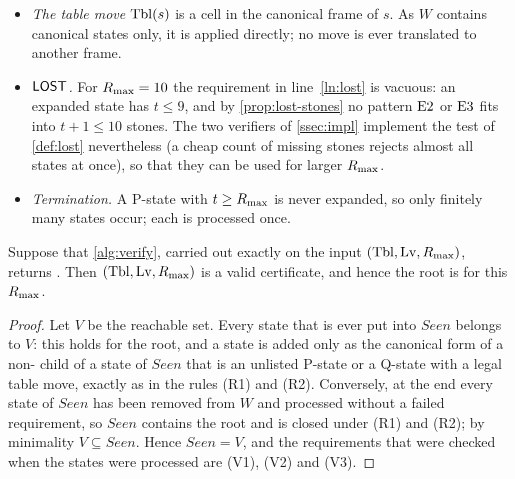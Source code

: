 \begin{itemize}[leftmargin=1.6em]
  the same parent, while children of different states with the same canonical form are counted
  separately. A \VOID{} child of type (ii) is counted at the round $t$ of its parent.
\item \emph{The table move} $\mathrm{Tbl}(s)$ is a cell in the canonical frame of $s$. As $W$ contains canonical
  states only, it is applied directly; no move is ever translated to another frame.
\item \emph{$\mathsf{LOST}$.} For $R_{\max}=10$ the requirement in line~\ref{ln:lost} is vacuous: an expanded state has
  $t\le 9$, and by \cref{prop:lost-stones} no pattern $\mathrm{E2}$ or $\mathrm{E3}$ fits into $t+1\le 10$ stones. The two
  verifiers of \cref{ssec:impl} implement the test of \cref{def:lost} nevertheless (a cheap count of
  missing stones rejects almost all states at once), so that they can be used for larger $R_{\max}$.
\item \emph{Termination.} A P-state with $t\ge R_{\max}$ is never expanded, so only finitely many states
  occur; each is processed once.
\end{itemize}

\begin{proposition}\label{prop:verify-correct}
Suppose that \cref{alg:verify}, carried out exactly on the input $(\mathrm{Tbl},\mathrm{Lv},R_{\max})$, returns \accept.
Then $(\mathrm{Tbl},\mathrm{Lv},R_{\max})$ is a valid certificate, and hence the root is \WON{} for this $R_{\max}$.
\end{proposition}

\begin{proof}
Let $V$ be the reachable set. Every state that is ever put into $\mathit{Seen}$ belongs to $V$: this holds
for the root, and a state is added only as the canonical form of a non-\VOID{} child of a state of
$\mathit{Seen}$ that is an unlisted P-state or a Q-state with a legal table move, exactly as in the rules
(R1) and (R2). Conversely, at the end every state of $\mathit{Seen}$ has been removed from $W$ and
processed without a failed requirement, so $\mathit{Seen}$ contains the root and is closed under (R1) and
(R2); by minimality $V\subseteq\mathit{Seen}$. Hence $\mathit{Seen}=V$, and the requirements that were
checked when the states were processed are (V1), (V2) and (V3).
\end{proof}

